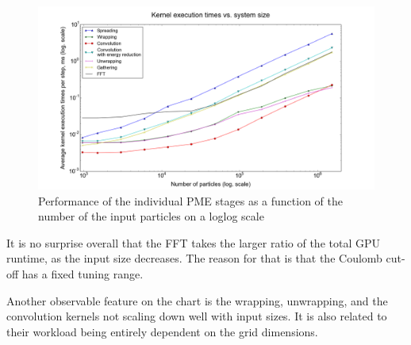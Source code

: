 \documentclass[12pt,a4paper]{report}
\begin{document}

\begin{figure} [h!]
    \centering
    \includegraphics[width=1\textwidth]{pics/kernels-noconcur-2.png}
    \caption{Performance of the individual PME stages as a function of the number of the input particles on a loglog scale}
    \label{fig:kernels}
\end{figure}

It is no surprise overall that the FFT takes the larger ratio of the total GPU runtime, as the input size decreases. The reason for that is that the Coulomb cut-off has a fixed tuning range.

Another observable feature on the chart is the wrapping, unwrapping, and the convolution kernels not scaling down well with input sizes. It is also related to their workload being entirely dependent on the grid dimensions.
\end{document}
